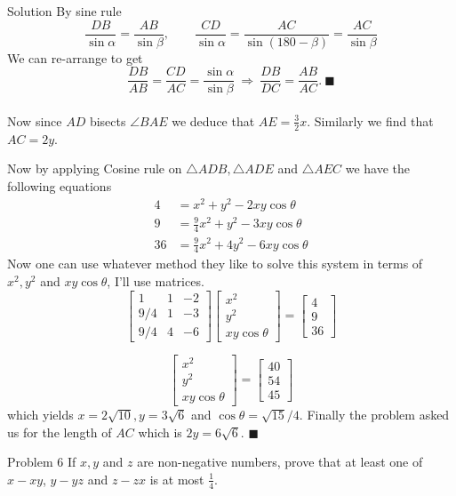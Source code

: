 \documentclass{article}
\begin{document}
\begin{solution}{Solution}
By sine rule
$$
\frac{DB}{\sin \alpha} = \frac{AB}{\sin \beta}, \quad \quad
\frac{CD}{\sin \alpha} = \frac{AC}{\sin (180 - \beta)} = \frac{AC}{\sin \beta}
$$
We can re-arrange to get
$$
\frac{DB}{AB} = \frac{CD}{AC} = \frac{\sin \alpha}{\sin \beta} \
\Rightarrow \
\frac{DB}{DC} = \frac{AB}{AC}. \ \blacksquare
$$
\\

Now since $AD$ bisects $\angle BAE$ we deduce that $AE = \frac32 x$.
Similarly we find that $AC = 2y$.
\vspace{0.2cm}

Now by applying Cosine rule on $\triangle ADB, \triangle ADE$ and
$\triangle AEC$ we have the following equations
\[
\begin{aligned}
4 &= x^2 + y^2 - 2xy \cos \theta \\
9 &= \frac94 x^2 + y^2 - 3xy \cos \theta \\
36 &= \frac94 x^2 + 4y^2 - 6xy \cos \theta
\end{aligned}
\]
Now one can use whatever method they like to solve this system
in terms of $x^2, y^2$ and $xy\cos \theta$, I'll use matrices.
$$
\begin{bmatrix}
1 & 1 & -2 \\
9/4 & 1 & -3 \\
9/4 & 4 & -6
\end{bmatrix}
\begin{bmatrix}
x^2 \\ y^2 \\ xy\cos \theta
\end{bmatrix}
=
\begin{bmatrix}
4 \\ 9 \\ 36
\end{bmatrix}
$$

$$
\begin{bmatrix}
x^2 \\ y^2 \\ xy\cos \theta
\end{bmatrix}
=
\begin{bmatrix}
40 \\ 54 \\ 45
\end{bmatrix}
$$
which yields $x = 2\sqrt{10}, y = 3\sqrt6$ and $\cos \theta = \sqrt{15}/4$.
Finally the problem asked us for the length of $AC$ which is
$2y = 6\sqrt6$. $\blacksquare$
\end{solution}
\newpage

\begin{problem}{Problem 6}
If $x, y$ and $z$ are non-negative numbers, prove that at least one of
$x - xy$, $y - yz$ and $z - zx$ is at most $\frac14$.
\end{problem}
\end{document}
